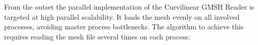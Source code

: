 
% 
% 

From the outset the parallel implementation of the Curvilinear GMSH Reader is targeted at high parallel scalability. It loads the mesh evenly on all involved processes, avoiding master process bottlenecks. The algorithm to achieve this requires reading the mesh file several times on each process:

